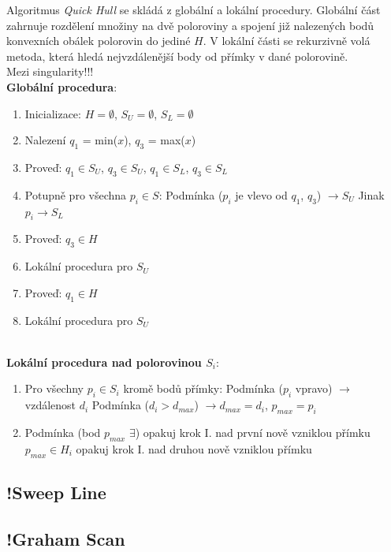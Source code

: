 \documentclass[a4paper, 12pt]{article}
\begin{document}
Algoritmus \textit{Quick Hull} se skládá z globální a lokální procedury. Globální část zahrnuje rozdělení množiny na dvě poloroviny a spojení již nalezených bodů konvexních obálek polorovin do jediné $H$. V lokální části se rekurzivně volá metoda, která hledá nejvzdálenější body od přímky v dané polorovině.\\

Mezi singularity!!!\\

\textbf{Globální procedura}:
\begin{enumerate}
\item Inicializace: $H = \emptyset$, $S_U = \emptyset$, $S_L = \emptyset$ 
\item Nalezení $q_1$ = min($x$), $q_3$ = max($x$)
\item Proveď: $q_1 \in S_U$, $q_3 \in S_U$, $q_1 \in S_L$, $q_3 \in S_L$
\item Potupně pro všechna $p_i \in S$:
\subitem Podmínka ($p_i$ je vlevo od $q_1$, $q_3$) $\rightarrow S_U$
\subitem Jinak $ p_i \rightarrow S_L$
\item Proveď: $q_3 \in H$
\item Lokální procedura pro $S_U$
\item Proveď: $q_1 \in H$
\item Lokální procedura pro $S_U$
\end{enumerate}
~\\
\textbf{Lokální procedura nad polorovinou $S_i$}:
\begin{enumerate}[label=\Roman*.]
\item Pro všechny $p_i \in S_i$ kromě bodů přímky:
\subitem Podmínka ($p_i$ vpravo) $\rightarrow$ vzdálenost $d_i$
\subsubitem Podmínka ($d_i > d_{max}$) $\rightarrow d_{max} = d_i$, $p_{max} = p_i$
\item Podmínka (bod $p_{max}$ $\exists$) 
\subitem opakuj krok I. nad první nově vzniklou přímku
\subitem $p_{max} \in H_i$
\subitem opakuj krok I. nad druhou nově vzniklou přímku
\end{enumerate}

\subsection{!Sweep Line}


\subsection{!Graham Scan}
\end{document}
